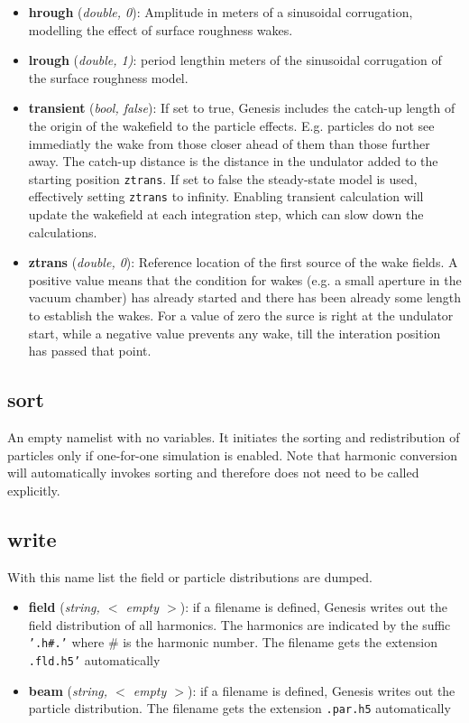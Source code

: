 \documentclass[12pt]{book}
\begin{document}
\begin{itemize}
\item {\bf hrough} ({\it double, 0}): Amplitude in meters of a sinusoidal corrugation, modelling the effect of surface roughness wakes.
\item {\bf lrough} ({\it double, 1)}: period lengthin meters of the sinusoidal corrugation of the surface roughness model.
\item {\bf transient} ({\it bool, false}): If set to true, Genesis includes the catch-up length of the origin of the wakefield to the particle effects. E.g. particles do not see immediatly the wake from those closer ahead of them than those further away. The catch-up distance is the distance in the undulator added to the starting position {\tt ztrans}. If set to false the steady-state model is used, effectively setting {\tt ztrans} to infinity. Enabling transient calculation will update the wakefield at each integration step, which can slow down the calculations.
\item {\bf ztrans} ({\it double, 0}): Reference location of the first source of the wake fields. A positive value means that the condition for wakes (e.g. a small aperture in the vacuum chamber) has already started and there has been already some length to establish the wakes. For a value of zero the surce is right at the undulator start, while a negative value prevents any wake, till the interation position has passed that point.
\end{itemize}


\subsection{\sf sort}
An empty namelist with no variables. It initiates the sorting and redistribution of particles only if one-for-one simulation is enabled. Note that harmonic conversion will automatically invokes sorting and therefore does not need to be called explicitly.

\subsection{\sf write}
With this name list the field  or particle distributions are dumped.
\begin{itemize}
\item {\bf field} ({\it string, $<$ empty $>$}): if a filename is defined, Genesis writes out the field distribution of all harmonics. The harmonics are indicated by the suffic {\tt '.h\#.'} where \# is the harmonic number. The filename gets the extension {\tt .fld.h5'} automatically
\item {\bf beam} ({\it string, $<$ empty $>$}): if a filename is defined, Genesis writes out the particle distribution. The filename gets the extension {\tt .par.h5} automatically
\end{itemize}
\end{document}
